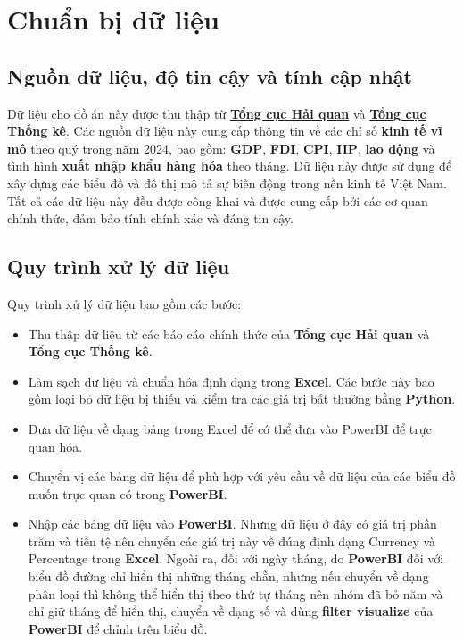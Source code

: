 \documentclass[a4paper]{report}
\begin{document}
{{\section{Chuẩn bị dữ liệu}
\subsection{Nguồn dữ liệu, độ tin cậy và tính cập nhật}
Dữ liệu cho đồ án này được thu thập từ \href{https://www.customs.gov.vn/}{\textbf{Tổng cục Hải quan}} và \href{https://www.gso.gov.vn/}{\textbf{Tổng cục Thống kê}}. Các nguồn dữ liệu này cung cấp thông tin về các chỉ số \textbf{kinh tế vĩ mô} theo quý trong năm 2024, bao gồm: \textbf{GDP}, \textbf{FDI}, \textbf{CPI}, \textbf{IIP}, \textbf{lao động} và tình hình \textbf{xuất nhập khẩu hàng hóa} theo tháng. Dữ liệu này được sử dụng để xây dựng các biểu đồ và đồ thị mô tả sự biến động trong nền kinh tế Việt Nam. Tất cả các dữ liệu này đều được công khai và được cung cấp bởi các cơ quan chính thức, đảm bảo tính chính xác và đáng tin cậy.

\subsection{Quy trình xử lý dữ liệu}
Quy trình xử lý dữ liệu bao gồm các bước:
\begin{itemize}
    \item Thu thập dữ liệu từ các báo cáo chính thức của \textbf{Tổng cục Hải quan} và \textbf{Tổng cục Thống kê}.
    \item Làm sạch dữ liệu và chuẩn hóa định dạng trong \textbf{Excel}. Các bước này bao gồm loại bỏ dữ liệu bị thiếu và kiểm tra các giá trị bất thường bằng \textbf{Python}.
    \item Đưa dữ liệu về dạng bảng trong Excel để có thể đưa vào PowerBI để trực quan hóa.
    \item Chuyển vị các bảng dữ liệu để phù hợp với yêu cầu về dữ liệu của các biểu đồ muốn trực quan có trong \textbf{PowerBI}.
    \item Nhập các bảng dữ liệu vào \textbf{PowerBI}. Nhưng dữ liệu ở đây có giá trị phần trăm và tiền tệ nên chuyển các giá trị này về đúng định dạng Currency và Percentage trong \textbf{Excel}. Ngoài ra, đối với ngày tháng, do \textbf{PowerBI} đối với biểu đồ đường chỉ hiển thị những tháng chẵn, nhưng nếu chuyển về dạng phân loại thì không thể hiển thị theo thứ tự tháng nên nhóm đã bỏ năm và chỉ giữ tháng để hiển thị, chuyển về dạng số và dùng \textbf{filter visualize} của \textbf{PowerBI} để chỉnh trên biểu đồ.
\end{itemize}

}}
\end{document}
